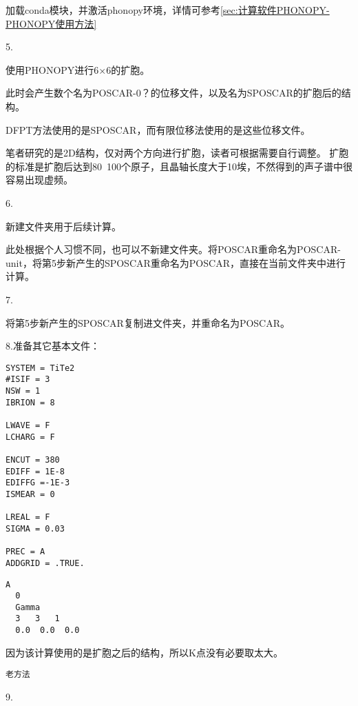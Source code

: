 加载conda模块，并激活phonopy环境，详情可参考\ref{sec:计算软件PHONOPY-PHONOPY使用方法}

5.

使用PHONOPY进行6×6的扩胞。

此时会产生数个名为POSCAR-0？的位移文件，以及名为SPOSCAR的扩胞后的结构。

DFPT方法使用的是SPOSCAR，而有限位移法使用的是这些位移文件。

\begin{attention}
   笔者研究的是2D结构，仅对两个方向进行扩胞，读者可根据需要自行调整。
   扩胞的标准是扩胞后达到80~100个原子，且晶轴长度大于10埃，不然得到的声子谱中很容易出现虚频。
\end{attention}

6.

新建文件夹用于后续计算。

\begin{extend}
  此处根据个人习惯不同，也可以不新建文件夹。将POSCAR重命名为POSCAR-unit，将第5步新产生的SPOSCAR重命名为POSCAR，直接在当前文件夹中进行计算。
\end{extend}

7.

将第5步新产生的SPOSCAR复制进文件夹，并重命名为POSCAR。

8.准备其它基本文件：

\begin{lstlisting}[caption=INCAR]
SYSTEM = TiTe2
#ISIF = 3
NSW = 1
IBRION = 8

LWAVE = F
LCHARG = F

ENCUT = 380
EDIFF = 1E-8
EDIFFG =-1E-3
ISMEAR = 0

LREAL = F
SIGMA = 0.03

PREC = A
ADDGRID = .TRUE.
\end{lstlisting}

\begin{lstlisting}[caption=KPOINTS]
  A
  0
  Gamma
  3   3   1
  0.0  0.0  0.0
\end{lstlisting}

\begin{attention}
 因为该计算使用的是扩胞之后的结构，所以K点没有必要取太大。
\end{attention}

\begin{lstlisting}[caption=POTCAR]
  老方法
\end{lstlisting}


9.

